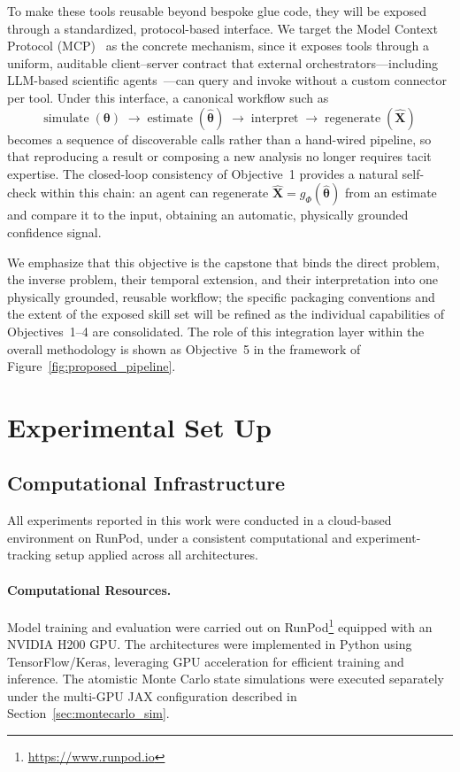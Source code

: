 \documentclass[letterpaper, 12, one column]{article}
\begin{document}
To make these tools reusable beyond bespoke glue code, they will be exposed through a standardized, protocol-based interface. We target the Model Context Protocol (MCP)~\cite{hou2025mcp} as the concrete mechanism, since it exposes tools through a uniform, auditable client--server contract that external orchestrators---including LLM-based scientific agents~\cite{gridach2025agentic,ghafarollahi2024atomagents}---can query and invoke without a custom connector per tool. Under this interface, a canonical workflow such as
\begin{equation}\label{eq:agent_chain}
\text{simulate}\;(\boldsymbol{\theta})\;\rightarrow\;\text{estimate}\;(\hat{\boldsymbol{\theta}})\;\rightarrow\;\text{interpret}\;\rightarrow\;\text{regenerate}\;(\hat{\mathbf{X}})
\end{equation}
becomes a sequence of discoverable calls rather than a hand-wired pipeline, so that reproducing a result or composing a new analysis no longer requires tacit expertise. The closed-loop consistency of Objective~1 provides a natural self-check within this chain: an agent can regenerate $\hat{\mathbf{X}}=g_{\Phi}(\hat{\boldsymbol{\theta}})$ from an estimate and compare it to the input, obtaining an automatic, physically grounded confidence signal.

We emphasize that this objective is the capstone that binds the direct problem, the inverse problem, their temporal extension, and their interpretation into one physically grounded, reusable workflow; the specific packaging conventions and the extent of the exposed skill set will be refined as the individual capabilities of Objectives~1--4 are consolidated. The role of this integration layer within the overall methodology is shown as Objective~5 in the framework of Figure~\ref{fig:proposed_pipeline}.

\section{Experimental Set Up} \label{sec:Exp}

\subsection{Computational Infrastructure}

All experiments reported in this work were conducted in a cloud-based environment on RunPod, under a consistent computational and experiment-tracking setup applied across all architectures.

\paragraph{Computational Resources.}
Model training and evaluation were carried out on RunPod\footnote{\url{https://www.runpod.io}} equipped with an NVIDIA H200 GPU. The architectures were implemented in Python using TensorFlow/Keras, leveraging GPU acceleration for efficient training and inference. The atomistic Monte Carlo state simulations were executed separately under the multi-GPU JAX configuration described in Section~\ref{sec:montecarlo_sim}.
\end{document}
